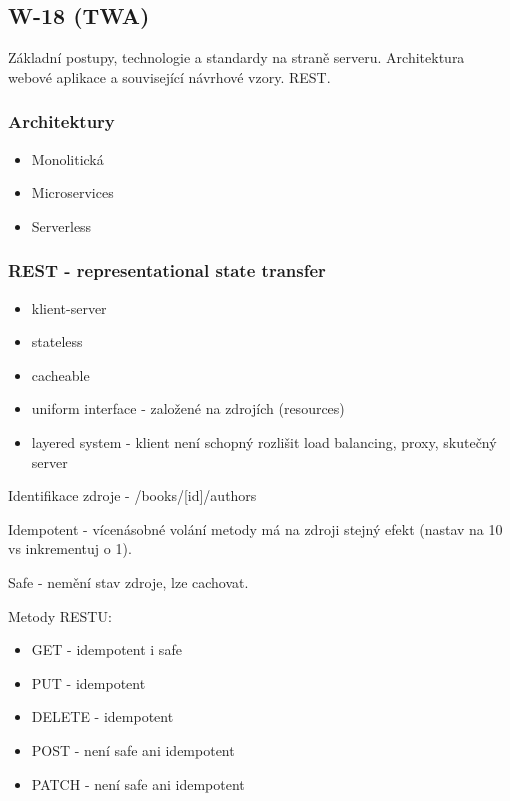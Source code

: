 \subsection{W-18 (TWA)}
Základní postupy, technologie a standardy na straně serveru. Architektura webové aplikace a související návrhové vzory. REST.

\subsubsection*{Architektury}
\begin{itemize}
  \item Monolitická
  \item Microservices
  \item Serverless
\end{itemize}

\subsubsection*{REST - representational state transfer}
\begin{itemize}
  \item klient-server
  \item stateless
  \item cacheable  
  \item uniform interface - založené na zdrojích (resources)
  \item layered system - klient není schopný rozlišit load balancing, proxy, skutečný server
\end{itemize}

Identifikace zdroje - /books/[id]/authors

Idempotent - vícenásobné volání metody má na zdroji stejný efekt (nastav na 10 vs inkrementuj o 1).

Safe - nemění stav zdroje, lze cachovat.

Metody RESTU:

\begin{itemize}
  \item GET - idempotent i safe
  \item PUT - idempotent
  \item DELETE - idempotent
  \item POST - není safe ani idempotent
  \item PATCH - není safe ani idempotent
\end{itemize}
